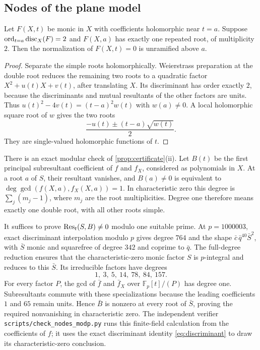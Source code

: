\subsection{Nodes of the plane model}

\begin{lemma}\label{lem:node}
Let $F(X,t)$ be monic in $X$ with coefficients holomorphic near $t=a$.
Suppose $\operatorname{ord}_{t=a}\operatorname{disc}_X(F)=2$ and $F(X,a)$ has exactly one repeated
root, of multiplicity $2$. Then the normalization of $F(X,t)=0$ is
unramified above $a$.
\end{lemma}
\begin{proof}
Separate the simple roots holomorphically. Weierstrass preparation at the
double root reduces the remaining two roots to a quadratic factor
$X^2+u(t)X+v(t)$, after translating $X$. Its discriminant has order exactly
$2$, because the discriminants and mutual resultants of the other factors
are units. Thus
$u(t)^2-4v(t)=(t-a)^2w(t)$ with $w(a)\ne0$. A local holomorphic square root
of $w$ gives the two roots
\[
 \frac{-u(t)\pm(t-a)\sqrt{w(t)}}{2}.
\]
They are single-valued holomorphic functions of $t$.
\end{proof}

There is an exact modular check of \cref{prop:certificate}\textup{(ii)}.
Let $B(t)$ be the first principal subresultant coefficient of $f$ and
$f_X$, considered as polynomials in $X$. At a root $a$ of $S$, their
resultant vanishes, and $B(a)\ne0$ is equivalent to
$\deg\gcd(f(X,a),f_X(X,a))=1$. In characteristic zero this degree is
$\sum_j(m_j-1)$, where $m_j$ are the root multiplicities. Degree one
therefore means exactly one double root, with all other roots simple.

It suffices to prove $\operatorname{Res}_t(S,B)\ne0$ modulo one suitable prime.
At $p=1000003$, exact discriminant interpolation modulo $p$ gives degree
$764$ and the shape $\bar c\,\bar q^{40}\bar S^2$, with $\bar S$ monic
and squarefree of degree $342$ and coprime to $\bar q$.
The full-degree reduction ensures that the characteristic-zero monic
factor $S$ is $p$-integral and reduces to this $\bar S$.
Its irreducible factors have degrees
\[
 1,\ 3,\ 5,\ 14,\ 78,\ 84,\ 157.
\]
For every factor $P$, the gcd of $\bar f$ and $\bar f_X$ over
$\mathbb F_p[t]/(P)$ has degree one. Subresultants commute with these
specializations because the leading coefficients $1$ and $65$ remain
units. Hence $\bar B$ is nonzero at every root of $\bar S$, proving the
required nonvanishing in characteristic zero. The independent verifier
\texttt{scripts/check\_nodes\_modp.py} runs this finite-field calculation
from the coefficients of $f$; it uses the exact discriminant identity
\eqref{eq:discriminant} to draw its characteristic-zero conclusion.

